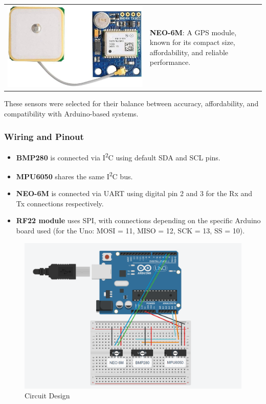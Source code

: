 \documentclass{article}
\begin{document}
\begin{tabular}{@{}m{} m{}@{}}
    \includegraphics[width=0.9\linewidth]{assets/neo_6M_gps.jpg} &
    \textbf{NEO-6M}: A GPS module, known for its compact size, affordability, and reliable performance. \\
\end{tabular}

These sensors were selected for their balance between accuracy, affordability, and compatibility with Arduino-based systems.


\subsubsection{Wiring and Pinout}
\begin{itemize}
    \item \textbf{BMP280} is connected via I\textsuperscript{2}C using default SDA and SCL pins.
    \item \textbf{MPU6050} shares the same I\textsuperscript{2}C bus.
    \item \textbf{NEO-6M} is connected via UART using digital pin 2 and 3 for the Rx and Tx connections respectively.
    \item \textbf{RF22 module} uses SPI, with connections depending on the specific Arduino board used (for the Uno: MOSI = 11, MISO = 12, SCK = 13, SS = 10).
\end{itemize}
\begin{figure} [h]
        \centering
        \includegraphics[width=0.6\linewidth]{assets/circuit-design.png}
        \caption{Circuit Design}
        \label{fig:enter-label}
\end{figure}
\newpage
\end{document}
